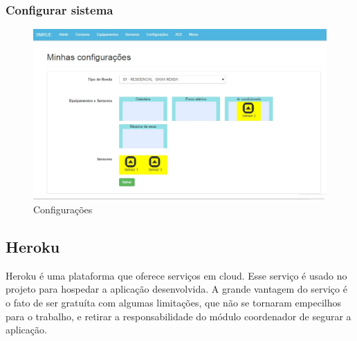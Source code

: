 \subsubsection{Configurar sistema}
\begin{figure}[H]
\centering
\includegraphics[width=1\textwidth]{figuras/configuracoes.jpg}
\caption{\label{fig:telas-config} Configurações}
\end{figure}



\subsection{Heroku}

Heroku é uma plataforma que oferece serviços em cloud. Esse serviço é usado no projeto para hospedar a aplicação desenvolvida. A grande vantagem do serviço  é o fato de ser gratuíta com algumas limitações, que não se tornaram empecilhos para o trabalho, e retirar a responsabilidade do módulo coordenador de segurar a aplicação.